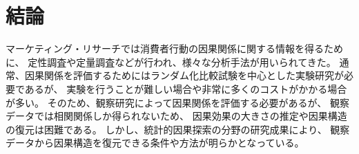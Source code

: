 
\section{結論}
\label{part:conclusion}

マーケティング・リサーチでは消費者行動の因果関係に関する情報を得るために、
定性調査や定量調査などが行われ、様々な分析手法が用いられてきた。
通常、因果関係を評価するためにはランダム化比較試験を中心とした実験研究が必要であるが、
実験を行うことが難しい場合や非常に多くのコストがかかる場合が多い。
そのため、観察研究によって因果関係を評価する必要があるが、
観察データでは相関関係しか得られないため、
因果効果の大きさの推定や因果構造の復元は困難である。
しかし、統計的因果探索の分野の研究成果により、
観察データから因果構造を復元できる条件や方法が明らかとなっている。






